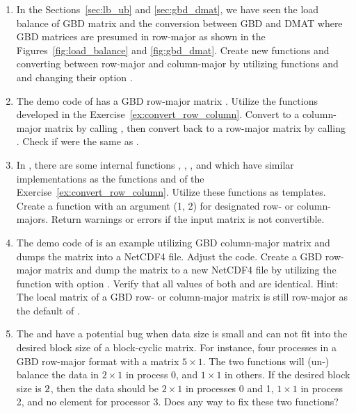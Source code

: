 \begin{enumerate}[label=\thechapter-\arabic*]
\item
\label{ex:convert_row_column}
In the Sections~\ref{sec:lb_ub} and \ref{sec:gbd_dmat},
we have seen the load balance of GBD matrix
and the conversion between GBD and DMAT where GBD matrices 
are presumed in row-major as shown in
the Figures~\ref{fig:load_balance} and \ref{fig:gbd_dmat}.
Create new functions
 and  converting between
row-major and column-major by utilizing functions 
and  and changing their option .

\item
The demo code  of  has a GBD row-major
matrix .
Utilize the functions developed in the
Exercise~\ref{ex:convert_row_column}.
Convert  to a column-major matrix 
by calling , then convert  back to a
row-major matrix  by calling .
Check if  were the same as .

\item
In , there are some internal functions ,
, , and
 which have similar implementations as the
functions  and  of the
Exercise~\ref{ex:convert_row_column}. Utilize these functions as templates.
Create a function  with an argument  (1, 2)
for designated row- or column-majors.
Return warnings or errors if the input matrix is not convertible.

\item
\label{ex:nc4_gbdr}
The demo code  of  is an example utilizing
GBD column-major matrix  
and dumps the matrix into a NetCDF4
file. Adjust the code. Create a GBD row-major matrix  and dump
the matrix to a new NetCDF4 file  by utilizing the function
 with option . Verify that all
 values of both  and 
are identical.
{\color{blue}Hint:
The local matrix of a GBD row- or column-major matrix is still
row-major as the default of .
}

\item
The  and  have a potential bug
when data size is small and can not fit into the desired block size of
a block-cyclic matrix. For instance, four processes in
a GBD row-major format with a matrix $5\times 1$. The two functions will
(un-) balance the data in $2\times 1$ in process 0, and $1\times 1$ in others.
If the desired block size is $2\time 1$, then the data should be
$2\times 1$ in processes 0 and 1, $1\times 1$ in process 2, and no
element for processor 3. Does any way to fix these two functions?

\end{enumerate}

